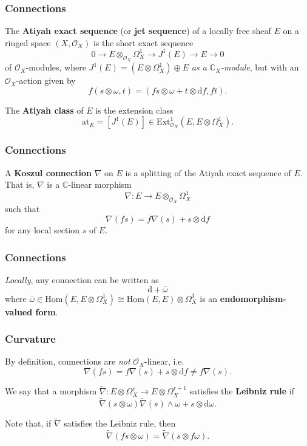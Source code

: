 \documentclass{beamer}
\begin{document}
  \begin{frame}\frametitle{Connections}
    \begin{definition}
      The \textbf{Atiyah exact sequence} (or \textbf{jet sequence}) of a locally free sheaf $E$ on a ringed space $(X,\mathcal{O}_X)$ is the short exact sequence
      \[
        0
        \to E\otimes_{\mathcal{O}_X}\Omega_X^1
        \to J^1(E)
        \to E
        \to 0
      \]
      of $\mathcal{O}_X$-modules, where $J^1(E) = (E\otimes\Omega_X^1)\oplus E$ \emph{as a $\mathbb{C}_X$-module}, but with an $\mathcal{O}_X$-action given by
      \[
        f(s\otimes\omega, t) = (fs\otimes\omega+t\otimes\mathrm{d}f, ft).
      \]

      The \textbf{Atiyah class} of $E$ is the extension class
      \[
        \mathrm{at}_E
        = [J^1(E)] \in \mathrm{Ext}_{\mathcal{O}_X}^1(E,E\otimes\Omega_X^1).
      \]
    \end{definition}
  \end{frame}

  \begin{frame}\frametitle{Connections}
    \begin{definition}
      A \textbf{Koszul connection} $\nabla$ on $E$ is a splitting of the Atiyah exact sequence of $E$.
      That is, $\nabla$ is a $\mathbb{C}$-linear morphism
      \[
        \nabla\colon E \to E\otimes_{\mathcal{O}_X}\Omega_X^1
      \]
      such that
      \[
        \nabla(fs) = f\nabla(s) + s\otimes\mathrm{d}f
      \]
      for any local section $s$ of $E$.
    \end{definition}
  \end{frame}

  \begin{frame}\frametitle{Connections}
    \begin{lemma}
      \emph{Locally}, any connection can be written as
      \[
        \mathrm{d} + \overline{\omega}
      \]
      where $\overline{\omega} \in \underline{\mathrm{Hom}}(E,E\otimes\Omega_X^1) \cong \underline{\mathrm{Hom}}(E,E)\otimes\Omega_X^1$ is an \textbf{endomorphism-valued form}.
    \end{lemma}
  \end{frame}

  \begin{frame}\frametitle{Curvature}
    By definition, connections are \emph{not} $\mathcal{O}_X$-linear, i.e.
    \[
      \nabla(fs) = f\nabla(s) + s\otimes\mathrm{d}f
      \neq f\nabla(s).
    \]

    \pause

    \begin{definition}
      We say that a morphism $\widetilde{\nabla}\colon E\otimes\Omega_X^r \to E\otimes\Omega_X^{r+1}$ satisfies the \textbf{Leibniz rule} if
      \[
        \widetilde{\nabla}(s\otimes\omega)
        \widetilde{\nabla}(s)\wedge\omega + s\otimes\mathrm{d}\omega.
      \]
    \end{definition}

    \pause

    Note that, if $\widetilde{\nabla}$ satisfies the Leibniz rule, then
    \[
      \widetilde{\nabla}(fs\otimes\omega)
      = \widetilde{\nabla}(s\otimes f\omega).
    \]
  \end{frame}
\end{document}

